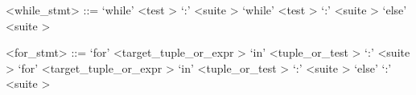 \label{whilezzzstmtb}

\begin{grammar}
<while_stmt> ::= `while' <test \myref[testb]> `:' <suite \myref[suiteb]>
	\alt `while' <test \myref[testb]> `:' <suite \myref[suiteb]> `else' <suite \myref[suiteb]>
\end{grammar}


\label{forzzzstmtb}

\begin{grammar}
<for_stmt> ::= `for' <target_tuple_or_expr \myref[targetzzztuplezzzorzzzexprb]> `in' <tuple_or_test \myref[tuplezzzorzzztestb]> `:' <suite \myref[suiteb]>
	\alt `for' <target_tuple_or_expr \myref[targetzzztuplezzzorzzzexprb]> `in' <tuple_or_test \myref[tuplezzzorzzztestb]> `:' <suite \myref[suiteb]> `else' `:' <suite \myref[suiteb]>
\end{grammar}


\label{tryzzzstmtb}

